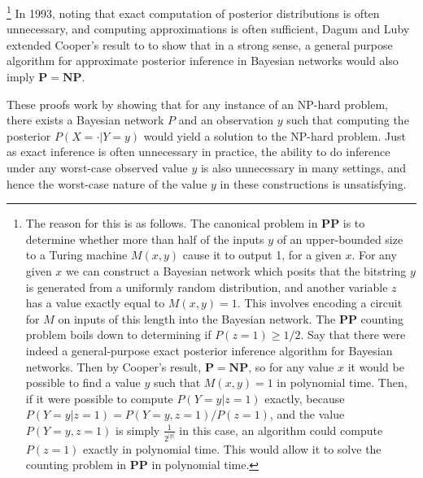 \documentclass{article}
\renewcommand{\P}{\mathbf{P}}
\newcommand{\NP}{\mathbf{NP}}
\def \PP{\P\P}
\theoremstyle{definition}
\theoremstyle{remark}
\begin{document}
\footnote{
The reason for this is as follows.
The canonical problem in $\PP$ is to determine whether more than half of the inputs $y$ of an upper-bounded size to a Turing machine $M(x, y)$ cause it to output 1, for a given $x$.
For any given $x$ we can construct a Bayesian network which posits that the bitstring $y$ is generated from a uniformly random distribution, and another variable $z$ has a value exactly equal to $M(x, y) = 1$.
This involves encoding a circuit for $M$ on inputs of this length into the Bayesian network.
The $\PP$ counting problem boils down to determining if $P(z = 1) \geq 1/2$.
Say that there were indeed a general-purpose exact posterior inference algorithm for Bayesian networks.
Then by Cooper's result, $\P = \NP$, so for any value $x$ it would be possible to find a value $y$ such that $M(x, y) = 1$ in polynomial time.
Then, if it were possible to compute $P(Y = y | z = 1)$ exactly,
because $P(Y = y | z = 1) = P(Y = y, z = 1) / P(z = 1)$, and the value $P(Y = y, z = 1)$ is simply $\frac{1}{2^{|y|}}$ in this case,
an algorithm could compute $P(z = 1)$ exactly in polynomial time.
This would allow it to solve the counting problem in $\PP$ in polynomial time.
}
In 1993, noting that exact computation of posterior distributions is often unnecessary, and computing approximations is often sufficient, Dagum and Luby \cite{dagum1993} extended Cooper's result to to show that in a strong sense, a general purpose algorithm for approximate posterior inference in Bayesian networks would also imply $\P = \NP$.

These proofs work by showing that for any instance of an NP-hard problem, there exists a Bayesian network $P$ and an observation $y$ such that computing the posterior $P(X = \cdot | Y = y)$ would yield a solution to the NP-hard problem.
Just as exact inference is often unnecessary in practice, the ability to do inference under any worst-case observed value $y$ is also unnecessary in many settings, and hence the worst-case nature of the value $y$ in these constructions is unsatisfying.
\end{document}
